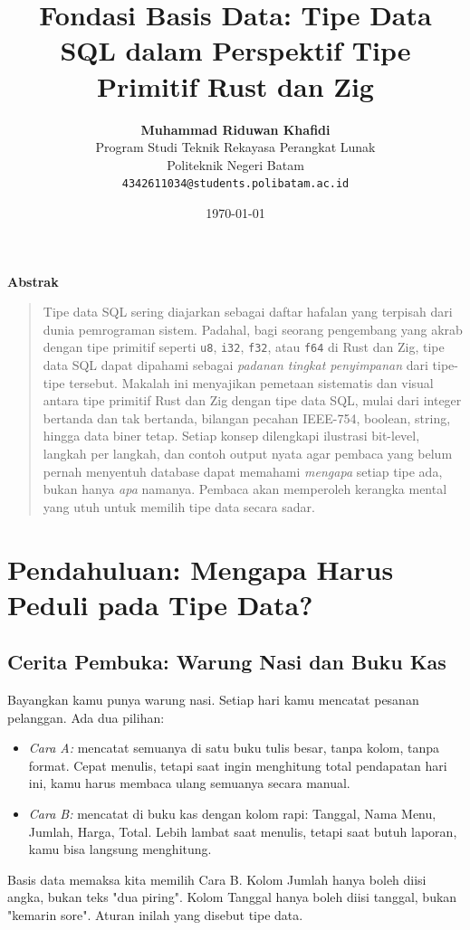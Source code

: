 \documentclass[11pt,a4paper]{article}
\title{\vspace{-1.5cm}\textbf{\sffamily\LARGE Fondasi Basis Data: Tipe Data SQL dalam Perspektif Tipe Primitif Rust dan Zig}}
\author{
	\textbf{Muhammad Riduwan Khafidi} \\
	\small Program Studi Teknik Rekayasa Perangkat Lunak \\
	\small Politeknik Negeri Batam \\
	\small \texttt{4342611034@students.polibatam.ac.id}
}
\date{\small\today}
\renewenvironment{abstract}
{\small
	\begin{center}\textbf{\sffamily Abstrak}\end{center}
	\begin{quote}}
	{\end{quote}}
\begin{document}
\maketitle
\thispagestyle{empty}

\begin{abstract}
	Tipe data SQL sering diajarkan sebagai daftar hafalan yang terpisah dari dunia pemrograman sistem. Padahal, bagi seorang pengembang yang akrab dengan tipe primitif seperti \texttt{u8}, \texttt{i32}, \texttt{f32}, atau \texttt{f64} di Rust dan Zig, tipe data SQL dapat dipahami sebagai \textit{padanan tingkat penyimpanan} dari tipe-tipe tersebut. Makalah ini menyajikan pemetaan sistematis dan visual antara tipe primitif Rust dan Zig dengan tipe data SQL, mulai dari integer bertanda dan tak bertanda, bilangan pecahan IEEE-754, boolean, string, hingga data biner tetap. Setiap konsep dilengkapi ilustrasi bit-level, langkah per langkah, dan contoh output nyata agar pembaca yang belum pernah menyentuh database dapat memahami \textit{mengapa} setiap tipe ada, bukan hanya \textit{apa} namanya. Pembaca akan memperoleh kerangka mental yang utuh untuk memilih tipe data secara sadar.
\end{abstract}

\section{Pendahuluan: Mengapa Harus Peduli pada Tipe Data?}

\subsection{Cerita Pembuka: Warung Nasi dan Buku Kas}

Bayangkan kamu punya warung nasi. Setiap hari kamu mencatat pesanan pelanggan. Ada dua pilihan:

\begin{itemize}
	\item \textit{Cara A:} mencatat semuanya di satu buku tulis besar, tanpa kolom, tanpa format. Cepat menulis, tetapi saat ingin menghitung total pendapatan hari ini, kamu harus membaca ulang semuanya secara manual.
	\item \textit{Cara B:} mencatat di buku kas dengan kolom rapi: Tanggal, Nama Menu, Jumlah, Harga, Total. Lebih lambat saat menulis, tetapi saat butuh laporan, kamu bisa langsung menghitung.
\end{itemize}

Basis data memaksa kita memilih Cara B. Kolom Jumlah hanya boleh diisi angka, bukan teks "dua piring". Kolom Tanggal hanya boleh diisi tanggal, bukan "kemarin sore". Aturan inilah yang disebut tipe data.
\end{document}
